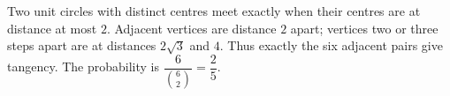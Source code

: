 Two unit circles with distinct centres meet exactly when their centres are at distance at most $2$. Adjacent vertices are distance $2$ apart; vertices two or three steps apart are at distances $2\sqrt3$ and $4$. Thus exactly the six adjacent pairs give tangency. The probability is $\dfrac{6}{\binom62}=\boxed{\dfrac{2}{5}}$.

